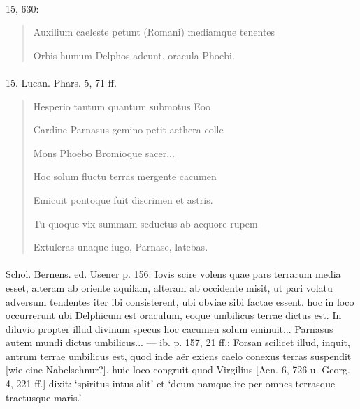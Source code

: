 \documentclass[a4paper, 11pt, oneside]{article}
\begin{document}
\paragraph{}
15, 630:
\begin{quotation}
Auxilium caeleste petunt (Romani) mediamque tenentes

Orbis humum Delphos adeunt, oracula Phoebi.
\end{quotation}
\paragraph{}
15. Lucan. Phars. 5, 71 ff.
\begin{quotation}
Hesperio tantum quantum submotus Eoo

Cardine Parnasus gemino petit aethera colle

Mons Phoebo Bromioque sacer...

\bigskip

Hoc solum fluctu terras mergente cacumen

Emicuit pontoque fuit discrimen et astris.

Tu quoque vix summam seductus ab aequore rupem

Extuleras unaque iugo, Parnase, latebas.
\end{quotation}
\paragraph{}
Schol. Bernens. ed. Usener p. 156: Iovis scire volens quae pars terrarum media esset, alteram ab oriente aquilam, alteram ab occidente misit, ut pari volatu adversum tendentes iter ibi consisterent, ubi obviae sibi factae essent. hoc in loco occurrerunt ubi Delphicum est oraculum, eoque umbilicus terrae dictus est. In diluvio propter illud divinum specus hoc cacumen solum eminuit... Parnasus autem mundi dictus umbilicus... --- ib. p. 157, 21 ff.: Forsan scilicet illud, inquit, antrum terrae umbilicus est, quod inde aër exiens caelo conexus terras suspendit [wie eine Nabelschnur?]. huic loco congruit quod Virgilius [Aen. 6, 726 u. Georg. 4, 221 ff.] dixit: `spiritus intus alit' et `deum namque ire per omnes terrasque tractusque maris.'
\end{document}
